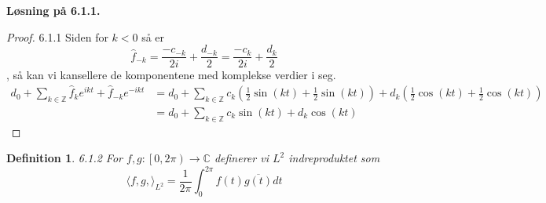 \documentclass[a4paper,norsk]{article}
\newtheorem*{definition}{Definition}
\newenvironment{oppgave}[1]%
	{\trivlist{}\item\relax\textbf{Løsning på #1.}\medspace}%
	{\endtrivlist}
\begin{document}
\begin{oppgave}{6.1.1}
\begin{proof}{6.1.1}
Siden for $ k < 0 $ så er $$ \hat{f}_{-k} = \frac{ -c_{-k} }{ 2i } + \frac{ d_{-k} }{ 2 } = \frac{ -c_k }{ 2i } + \frac{ d_k }{ 2 } $$, så kan vi kansellere de komponentene med komplekse verdier i seg.
\begin{align*}
  d_0 + \sum_{ k \in \mathbb{Z} }^{  } \hat{f}_k e^{ikt} + \hat{f}_{-k} e^{-ikt} &= d_0 + \sum_{ k \in \mathbb{Z} }^{  } c_k \left( \frac{ 1 }{ 2 } \sin(kt) + \frac{ 1 }{ 2 } \sin(kt)  \right) + d_k \left( \frac{ 1 }{ 2 } \cos(kt) + \frac{ 1 }{ 2 } \cos(kt) 
 \right) \\
 &= d_0 + \sum_{ k \in \mathbb{Z} }^{  } c_k \sin(kt) + d_k \cos(kt)  
\end{align*}
\end{proof}
\end{oppgave}


\begin{definition}{6.1.2}
For $ f, g : \left[ 0, 2\pi \right) \rightarrow \mathbb{C} $ definerer vi $ L^2 $ indreproduktet som 
\[
    \langle f, g,  \rangle_{ L^2 } = \frac{ 1 }{ 2\pi } \int_{0}^{2\pi}  f(t) \overline{g(t)}dt
\]
\end{definition}
\end{document}
